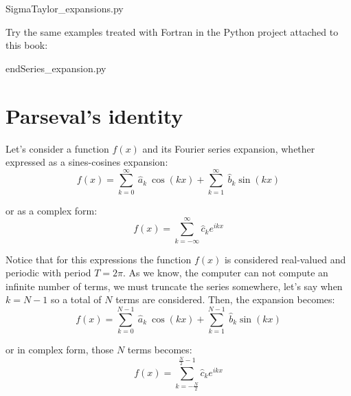  {Sigma}{Taylor_expansions.py}
  
 
    
   
   \newpage 
   Try the same examples treated with Fortran in the Python project attached to this book:
      
   \vspace{0.5cm}
   {end}{Series_expansion.py}
   \lstfor
   
   
   
   
  
  
  
  
  
   
\newpage 
\section{Parseval's identity} 

Let's consider a function $f(x)$ and its Fourier series expansion, whether expressed as a sines-cosines expansion:
\begin{equation} 
	f ( x)  =  \sum_{k=0} ^{\infty} \  \hat{a}_k  \ \cos\left(k x\right)  + \sum_{k=1} ^{\infty} \  \hat{b}_k  \sin\left(k x\right)
\end{equation} 	

or as a complex form:
\begin{equation} 
    f ( x)  =  \sum_{k=-\infty} ^{\infty}  \hat{c}_k  e^{ i k x }
\end{equation} 

Notice that for this expressions the function $f(x)$ is considered real-valued and periodic with period $T=2\pi$. As we know, the computer 
can not compute an infinite number of terms, we must truncate the series somewhere, let's say when $k = N-1$ so a total of $N$ terms are 
considered. Then, the expansion becomes:
\begin{equation} 
    f ( x)  =  \sum_{k=0} ^{N-1} \  \hat{a}_k  \ \cos\left(k x\right) + \sum_{k=1} ^{N-1} \  \hat{b}_k  \sin \left(k x\right)
\end{equation}

or in complex form, those $N$ terms becomes:
\begin{equation} 
    f ( x)  =  \sum_{k=-\frac{N}{2}} ^{\frac{N}{2}-1}  \hat{c}_k  e^{ i k x }
\end{equation} 

